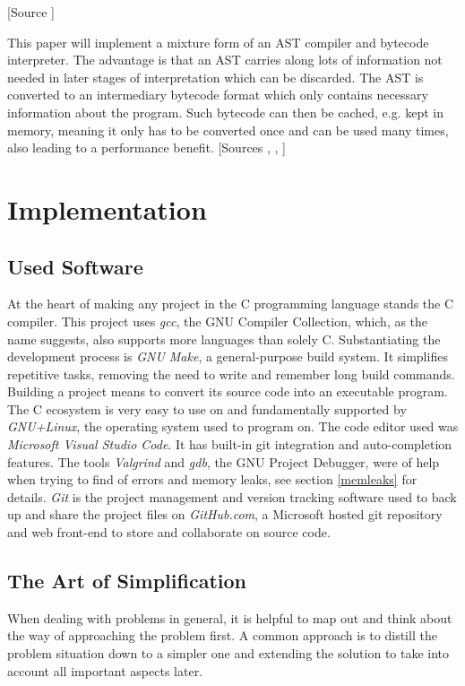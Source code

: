 \documentclass[12pt,a4paper]{article}
\begin{document}
[Source ]

This paper will implement a mixture form of an AST compiler and bytecode
interpreter. The advantage is that an AST carries along lots of information
not needed in later stages of interpretation which can be discarded. The AST
is converted to an intermediary bytecode format which only contains
necessary information about the program. Such bytecode can then be cached,
e.g. kept in memory, meaning it only has to be converted once and can be
used many times, also leading to a performance benefit.
[Sources , , ]

\section{Implementation}
\subsection{Used Software}
At the heart of making any project in the C programming language
stands the C compiler. This project uses
\emph{gcc}, the GNU Compiler Collection, which, as the name suggests, also 
supports more languages than solely C. Substantiating the development process is 
\emph{GNU Make}, a general-purpose build system. It simplifies repetitive tasks,
removing the need to write and remember long build commands. Building a project
means to convert its source code into an executable program.
The C ecosystem is very easy to use on and fundamentally supported by 
\emph{GNU+Linux}, the operating system used to program on.
The code editor used was \emph{Microsoft Visual Studio Code}.
It has built-in git integration and auto-completion features.
The tools \emph{Valgrind} and \emph{gdb}, the GNU Project Debugger, were of help
when trying to find of errors and memory leaks, see section \ref{memleaks} for details.
\emph{Git} is the project management and version tracking software used to back up and share
the project files on \emph{GitHub.com}, a Microsoft hosted git repository and
web front-end to store and collaborate on source code.

\subsection{The Art of Simplification}
When dealing with problems in general, it is helpful to map out and think about
the way of approaching the problem first. A common approach is to distill the
problem situation down to a simpler one and extending the solution to take into
account all important aspects later.
\end{document}

